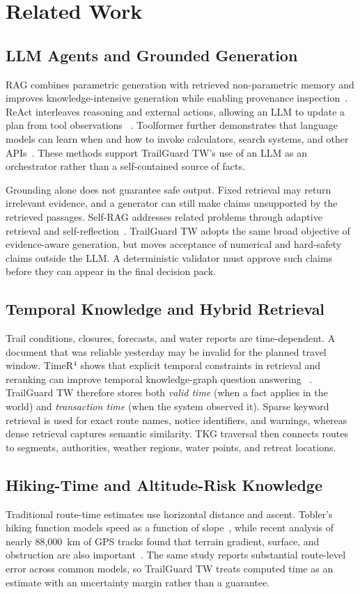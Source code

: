\documentclass[conference]{IEEEtran}
\begin{document}
\section{Related Work}
\label{sec:related-work}
\subsection{LLM Agents and Grounded Generation}
RAG combines parametric generation with retrieved non-parametric memory and
improves knowledge-intensive generation while enabling provenance
inspection~\cite{lewis2020rag}. ReAct interleaves reasoning and external
actions, allowing an LLM to update a plan from tool observations
~\cite{yao2023react}. Toolformer further demonstrates that language models can
learn when and how to invoke calculators, search systems, and other
APIs~\cite{schick2023toolformer}. These methods support TrailGuard TW's use of
an LLM as an orchestrator rather than a self-contained source of facts.

Grounding alone does not guarantee safe output. Fixed retrieval may return
irrelevant evidence, and a generator can still make claims unsupported by the
retrieved passages. Self-RAG addresses related problems through adaptive
retrieval and self-reflection~\cite{asai2024selfrag}. TrailGuard TW adopts the
same broad objective of evidence-aware generation, but moves acceptance of
numerical and hard-safety claims outside the LLM. A deterministic validator
must approve such claims before they can appear in the final decision pack.

\subsection{Temporal Knowledge and Hybrid Retrieval}
Trail conditions, closures, forecasts, and water reports are time-dependent.
A document that was reliable yesterday may be invalid for the planned travel
window. TimeR$^4$ shows that explicit temporal constraints in retrieval and
reranking can improve temporal knowledge-graph question answering
~\cite{qian2024timer4}. TrailGuard TW therefore stores both \emph{valid time}
(when a fact applies in the world) and \emph{transaction time} (when the
system observed it). Sparse keyword retrieval is used for exact route names,
notice identifiers, and warnings, whereas dense retrieval captures semantic
similarity. TKG traversal then connects routes to segments, authorities,
weather regions, water points, and retreat locations.

\subsection{Hiking-Time and Altitude-Risk Knowledge}
Traditional route-time estimates use horizontal distance and ascent. Tobler's
hiking function models speed as a function of slope~\cite{tobler1993}, while
recent analysis of nearly 88,000~km of GPS tracks found that terrain gradient,
surface, and obstruction are also important~\cite{wood2023}. The same study
reports substantial route-level error across common models, so TrailGuard TW
treats computed time as an estimate with an uncertainty margin rather than a
guarantee.
\end{document}
